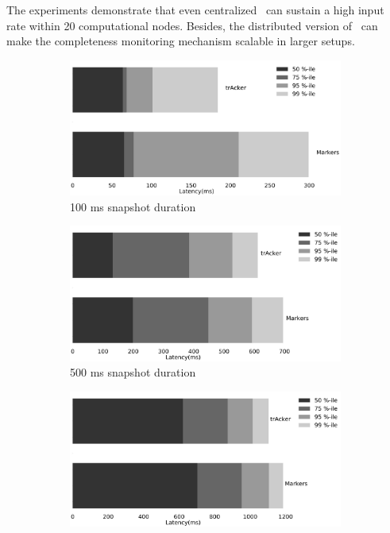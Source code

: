 The experiments demonstrate that even centralized \tracker\ can sustain a high input rate within 20 computational nodes. Besides, the distributed version of \tracker\ can make the completeness monitoring mechanism scalable in larger setups.

\begin{figure}[t!]
    \begin{subfigure}[b]{0.32\textwidth}
            \includegraphics[width=0.99\textwidth]{pics/buffering_latencies_barh_100.pdf}
            \caption{100 ms snapshot duration}
            \label{100ms_snapshot}
    \end{subfigure}
    \hspace{5mm}
    \begin{subfigure}[b]{0.32\textwidth}
            \includegraphics[width=0.99\textwidth]{pics/buffering_latencies_barh_500.pdf}
            \caption{500 ms snapshot duration}
            \label{500ms_snapshot}
    \end{subfigure}
    \hspace{5mm}
    \begin{subfigure}[b]{0.32\textwidth}
            \includegraphics[width=0.99\textwidth]{pics/buffering_latencies_barh_1000.pdf}

\end{subfigure}
\end{figure}
